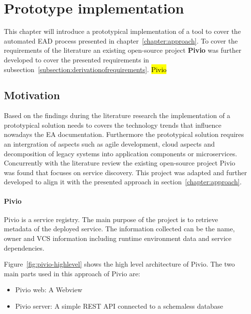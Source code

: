 
\chapter{Prototype implementation}\label{chapter:prototype implementation}

This chapter will introduce a prototypical implementation of a tool to cover the automated EAD process presented in chapter~\ref{chapter:approach}. To cover the requirements of the literature an existing open-source project \textbf{Pivio} was further developed to cover the presented requirements in subsection~\ref{subsection:derivationofrequirements}. \hl{Pivio}

\section{Motivation} 

Based on the findings during the literature research the implementation of a prototypical solution needs to covers  the technology trends that influence nowadays the EA documentation. Furthermore the prototypical solution requires an intergration of aspects such as agile development, cloud aspects and decomposition of legacy systems into application components or microservices. Concurrently with the literature review the existing open-source project Pivio was found that focuses on service discovery. This project was adapted and further developed to align it with the presented approach in section~\ref{chapter:approach}.

\subsubsection{Pivio}
Pivio is a service registry. The main purpose of the project is to retrieve metadata of the deployed service. The information collected can be the name, owner and VCS information including runtime environment data and service dependencies.

Figure~\ref{fig:pivio-highlevel} shows the high level architecture of Pivio. The two main parts used in this approach of Pivio are:
\begin{itemize}
    \item Pivio web: A Webview
    \item Pivio server: A simple REST API connected to a schemaless database
\end{itemize}

